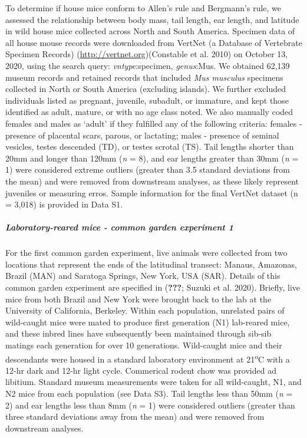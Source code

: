 \documentclass[]{article}
\let\oldsubparagraph\subparagraph
\renewcommand{\subparagraph}[1]{\oldsubparagraph{#1}\mbox{}}
\begin{document}
To determine if house mice conform to Allen's rule and Bergmann's rule,
we assessed the relationship between body mass, tail length, ear length,
and latitude in wild house mice collected across North and South
America. Specimen data of all house mouse records were downloaded from
VertNet (a Database of Vertebrate Specimen Records)
(\url{http://vertnet.org})(Constable et al. 2010) on October 13, 2020,
using the search query: \emph{vntype}:specimen, \emph{genus}:Mus. We
obtained 62,139 museum records and retained records that included
\emph{Mus musculus} specimens collected in North or South America
(excluding islands). We further excluded individuals listed as pregnant,
juvenile, subadult, or immature, and kept those identified as adult,
mature, or with no age class noted. We also manually coded females and
males as `adult' if they fulfilled any of the following criteria:
females - presence of placental scars, parous, or lactating; males -
presence of seminal vesicles, testes descended (TD), or testes scrotal
(TS). Tail lengths shorter than 20mm and longer than 120mm (\emph{n} =
8), and ear lengths greater than 30mm (\emph{n} = 1) were considered
extreme outliers (greater than 3.5 standard deviations from the mean)
and were removed from downstream analyses, as these likely represent
juveniles or measuring erros. Sample information for the final VertNet
dataset (n = 3,018) is provided in Data S1.

\hypertarget{laboratory-reared-mice---common-garden-experiment-1}{%
\subparagraph{\texorpdfstring{\emph{Laboratory-reared mice - common
garden experiment
1}}{Laboratory-reared mice - common garden experiment 1}}\label{laboratory-reared-mice---common-garden-experiment-1}}

For the first common garden experiment, live animals were collected from
two locations that represent the ends of the latitudinal transect:
Manaus, Amazonas, Brazil (MAN) and Saratoga Springs, New York, USA
(SAR). Details of this common garden experiment are specified in
({\textbf{???}}; Suzuki et al. 2020). Briefly, live mice from both
Brazil and New York were brought back to the lab at the University of
California, Berkeley. Within each population, unrelated pairs of
wild-caught mice were mated to produce first generation (N1) lab-reared
mice, and these inbred lines have subsequently been maintained through
sib-sib matings each generation for over 10 generations. Wild-caught
mice and their descendants were housed in a standard laboratory
environment at 21\textsuperscript{o}C with a 12-hr dark and 12-hr light
cycle. Commerical rodent chow was provided ad libitium. Standard museum
measurements were taken for all wild-caught, N1, and N2 mice from each
population (see Data S3). Tail lengths less than 50mm (\emph{n} = 2) and
ear lengths less than 8mm (\emph{n} = 1) were considered outliers
(greater than three standard deviations away from the mean) and were
removed from downstream analyses.
\end{document}
